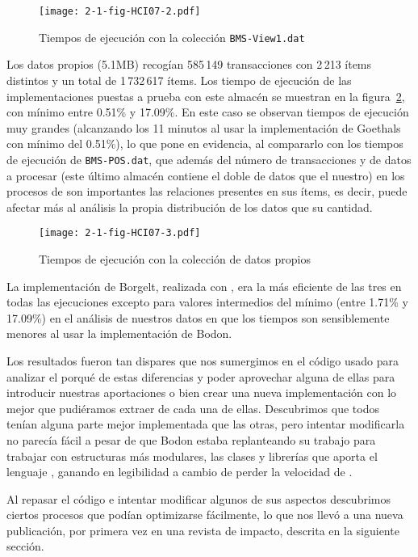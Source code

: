 \begin{figure}[htbp]
   \centering
   \texttt{[image: 2-1-fig-HCI07-2.pdf]}
   \caption{Tiempos de ejecución con la colección \texttt{BMS-View1.dat}}
\label{fig:2-1-apriori-tiemposEjecucionBMSView1}
\end{figure}

Los datos propios (5.1MB) recogían 585\,149 transacciones con 2\,213 ítems distintos y un total de 1\,732\,617 ítems. Los tiempo de ejecución de las implementaciones puestas a prueba con este almacén \D se muestran en la figura~\ref{fig:2-1-apriori-tiemposEjecucionNuestrosDatos}, con \soporte mínimo entre 0.51\% y 17.09\%. En este caso se observan tiempos de ejecución muy grandes (alcanzando los 11 minutos al usar la implementación de Goethals con \soporte mínimo del 0.51\%), lo que pone en evidencia, al compararlo con los tiempos de ejecución de \texttt{BMS-POS.dat}, que además del número de transacciones y de datos a procesar (este último almacén \D contiene el doble de datos que el nuestro) en los procesos de \arm son importantes las relaciones presentes en sus ítems, es decir, puede afectar más al análisis la propia distribución de los datos que su cantidad.

\begin{figure}[htbp]
   \centering
   \texttt{[image: 2-1-fig-HCI07-3.pdf]}
   \caption{Tiempos de ejecución con la colección de datos propios}
\label{fig:2-1-apriori-tiemposEjecucionNuestrosDatos}
\end{figure}

La implementación de Borgelt, realizada con \langC, era la más eficiente de las tres en todas las ejecuciones excepto para valores intermedios del \soporte mínimo (entre 1.71\% y 17.09\%) en el análisis de nuestros datos en que los tiempos son sensiblemente menores al usar la implementación de Bodon.

Los resultados fueron tan dispares que nos sumergimos en el código usado para analizar el porqué de estas diferencias y poder aprovechar alguna de ellas para introducir nuestras aportaciones o bien crear una nueva implementación con lo mejor que pudiéramos extraer de cada una de ellas. Descubrimos que todos tenían alguna parte mejor implementada que las otras, pero intentar modificarla no parecía fácil a pesar de que Bodon estaba replanteando su trabajo para trabajar con estructuras más modulares, las clases y librerías que aporta el lenguaje \langCpp, ganando en legibilidad a cambio de perder la velocidad de \langC.

Al repasar el código e intentar modificar algunos de sus aspectos descubrimos ciertos procesos que podían optimizarse fácilmente, lo que nos llevó a una nueva publicación, por primera vez en una revista de impacto, descrita en la siguiente sección.